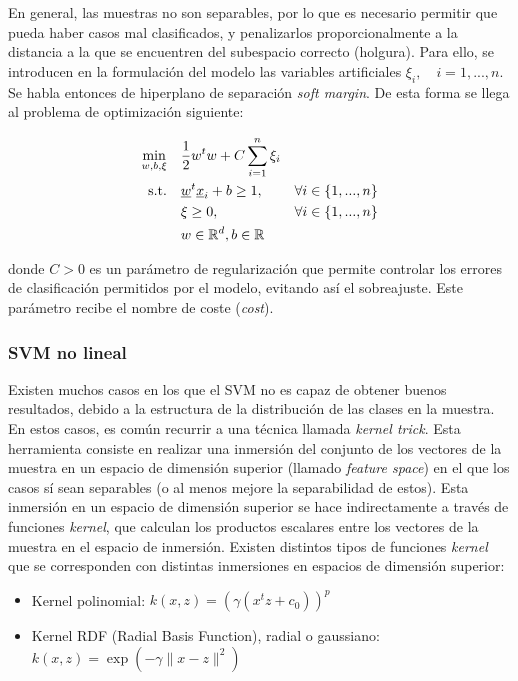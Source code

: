 \documentclass[12pt,a4paper,]{book}
\providecommand{\tightlist}{%
  \setlength{\itemsep}{0pt}\setlength{\parskip}{0pt}}
\numberwithin{dummy}{section}
\theoremstyle{ocrenumbox}
\theoremstyle{blacknumex}
\theoremstyle{blacknumbox}
\theoremstyle{ocrenum}
\theoremstyle{ocrenum}
\begin{document}
En general, las muestras no son separables, por lo que es necesario
permitir que pueda haber casos mal clasificados, y penalizarlos
proporcionalmente a la distancia a la que se encuentren del subespacio
correcto (holgura). Para ello, se introducen en la formulación del
modelo las variables artificiales \(\xi_i,\quad i=1,...,n\). Se habla
entonces de hiperplano de separación \emph{soft margin}. De esta forma
se llega al problema de optimización siguiente:

\begin{equation}
\begin{aligned}
\min_{w,b,\xi} \quad & \frac{1}{2}w^{t}w+C\sum_{i=1}^{n}{\xi_{i}}\\
\textrm{s.t.} \quad & \underline w^t \underline x_i+b \ge 1, \quad & \forall i\in \{1,...,n\}\\
  &\xi\geq0,   \quad & \forall i\in \{1,...,n\} \\
  & w \in \mathbb{R}^d, \space b \in \mathbb{R} \\
\end{aligned}
\end{equation}

donde \(C>0\) es un parámetro de regularización que permite controlar
los errores de clasificación permitidos por el modelo, evitando así el
sobreajuste. Este parámetro recibe el nombre de coste (\emph{cost}).

\hypertarget{svm-no-lineal}{%
\subsubsection{SVM no lineal}\label{svm-no-lineal}}

Existen muchos casos en los que el SVM no es capaz de obtener buenos
resultados, debido a la estructura de la distribución de las clases en
la muestra. En estos casos, es común recurrir a una técnica llamada
\emph{kernel trick}. Esta herramienta consiste en realizar una inmersión
del conjunto de los vectores de la muestra en un espacio de dimensión
superior (llamado \emph{feature space}) en el que los casos sí sean
separables (o al menos mejore la separabilidad de estos). Esta inmersión
en un espacio de dimensión superior se hace indirectamente a través de
funciones \emph{kernel}, que calculan los productos escalares entre los
vectores de la muestra en el espacio de inmersión. Existen distintos
tipos de funciones \emph{kernel} que se corresponden con distintas
inmersiones en espacios de dimensión superior:

\begin{itemize}
\tightlist
\item
  Kernel polinomial: \(k(x,z) = \left( \gamma(x^tz + c_0) \right)^p\)
\item
  Kernel RDF (Radial Basis Function), radial o gaussiano:
  \(k(x,z) = \exp(-\gamma \| x-z\|^2)\)
\end{itemize}
\end{document}
